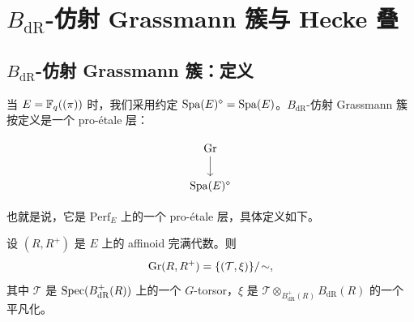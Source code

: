 

\section{\texorpdfstring{$B_{\mathrm{dR}}$}{BdR}-仿射 Grassmann 簇与 Hecke 叠}%
\subsection{\texorpdfstring{$B_{\mathrm{dR}}$}{BdR}-仿射 Grassmann 簇：定义}%

\leavevmode 当 $E=\mathbb{F}_q((\pi))$ 时，我们采用约定 $\mathrm{Spa}(E)^{\diamond}=\mathrm{Spa}(E)$。$B_{\mathrm{dR}}$-仿射 Grassmann 簇按定义是一个 pro-étale 层：

\[
\begin{tikzcd}
  \Gr \arrow[d] \\
  \Spa(E)^{\diamond}
\end{tikzcd}
\]

也就是说，它是 $\mathrm{Perf}_E$ 上的一个 pro-étale 层，具体定义如下。

\begin{definition}\label{def:3.1}
设 $(R,R^+)$ 是 $E$ 上的 affinoid 完满代数。则
\[
  \mathrm{Gr}(R,R^+)=\{(\mathcal{T},\xi)\}/\!\sim,
\]
其中 $\mathcal{T}$ 是 $\operatorname{Spec}(B_{\mathrm{dR}}^+(R))$ 上的一个 $G$-torsor，$\xi$ 是 $\mathcal{T}\otimes_{B_{\mathrm{dR}}^+(R)}B_{\mathrm{dR}}(R)$ 的一个平凡化。
\end{definition}

